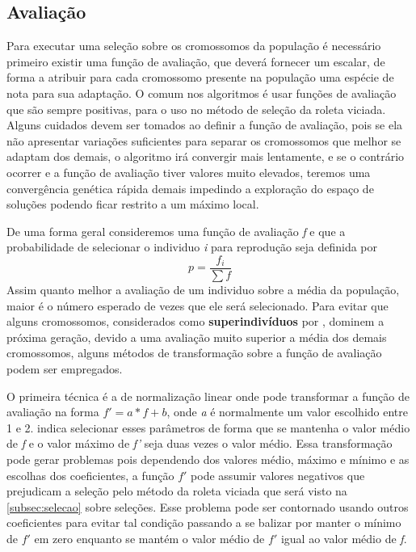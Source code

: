 \subsection{Avaliação}
Para executar uma seleção sobre os cromossomos da população é necessário primeiro existir uma função de avaliação, que deverá fornecer um escalar, de forma a atribuir para cada cromossomo presente na população uma espécie de nota para sua adaptação. O comum nos algoritmos é usar funções de avaliação que são sempre positivas, para o uso no método de seleção da roleta viciada. Alguns cuidados devem ser tomados ao definir a função de avaliação, pois se ela não apresentar variações suficientes para separar os cromossomos que melhor se adaptam dos demais, o algoritmo irá convergir mais lentamente, e se o contrário ocorrer e a função de avaliação tiver valores muito elevados, teremos uma convergência genética rápida demais impedindo a exploração do espaço de soluções podendo ficar restrito a um máximo local.

De uma forma geral consideremos uma função de avaliação \textit{f} e que a probabilidade de selecionar o individuo \textit{i} para reprodução seja definida por \[p = \frac{f_i}{\sum{f}}\]
Assim quanto melhor a avaliação de um individuo sobre a média da população, maior é o número esperado de vezes que ele será selecionado. Para evitar que alguns cromossomos, considerados como \textbf{superindivíduos} por \citeauthor{Linden2008}, dominem a próxima geração, devido a uma avaliação muito superior a média dos demais cromossomos, alguns métodos de transformação sobre a função de avaliação podem ser empregados. 

O primeira técnica é a de normalização linear onde pode transformar a função de avaliação na forma \( f' = a * f + b\), onde \textit{a} é normalmente um valor escolhido entre 1 e 2. \citeauthor{Goldberg1989} indica selecionar esses parâmetros de forma que se mantenha o valor médio de \textit{f} e o valor máximo de \textit{f'} seja duas vezes o valor médio. Essa transformação pode gerar problemas pois  dependendo dos valores médio, máximo e mínimo e as escolhas dos coeficientes, a função \(f'\) pode assumir valores negativos que prejudicam a seleção pelo método da roleta viciada que será visto na \autoref{subsec:selecao} sobre seleções. Esse problema pode ser contornado usando outros coeficientes para evitar tal condição passando a se balizar por manter o mínimo de \(f'\) em zero enquanto se mantém o valor médio de \(f'\) igual ao valor médio de \textit{f}.

